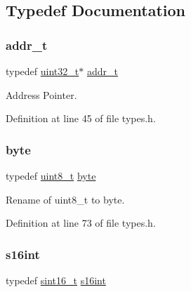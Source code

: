 \subsection{Typedef Documentation}
\mbox{\label{a00116_a295f71165288684c38c6bb836fbb3c59_a295f71165288684c38c6bb836fbb3c59}} 
\subsubsection{\texorpdfstring{addr\+\_\+t}{addr\_t}}
{\footnotesize\ttfamily typedef \hyperlink{a00116_a435d1572bf3f880d55459d9805097f62_a435d1572bf3f880d55459d9805097f62}{uint32\+\_\+t}$\ast$ \hyperlink{a00116_a295f71165288684c38c6bb836fbb3c59_a295f71165288684c38c6bb836fbb3c59}{addr\+\_\+t}}



Address Pointer. 



Definition at line 45 of file types.\+h.

\mbox{\label{a00116_ab8ef12fab634c171394422d0ee8baf94_ab8ef12fab634c171394422d0ee8baf94}} 
\subsubsection{\texorpdfstring{byte}{byte}}
{\footnotesize\ttfamily typedef \hyperlink{a00116_aba7bc1797add20fe3efdf37ced1182c5_aba7bc1797add20fe3efdf37ced1182c5}{uint8\+\_\+t} \hyperlink{a00116_ab8ef12fab634c171394422d0ee8baf94_ab8ef12fab634c171394422d0ee8baf94}{byte}}



Rename of uint8\+\_\+t to byte. 



Definition at line 73 of file types.\+h.

\mbox{\label{a00116_aec3378c6eece6833fe2ad4a8eb49ef61_aec3378c6eece6833fe2ad4a8eb49ef61}} 
\subsubsection{\texorpdfstring{s16int}{s16int}}
{\footnotesize\ttfamily typedef \hyperlink{a00116_a5881659ed80e940350d12831204375cd_a5881659ed80e940350d12831204375cd}{sint16\+\_\+t} \hyperlink{a00116_aec3378c6eece6833fe2ad4a8eb49ef61_aec3378c6eece6833fe2ad4a8eb49ef61}{s16int}}



